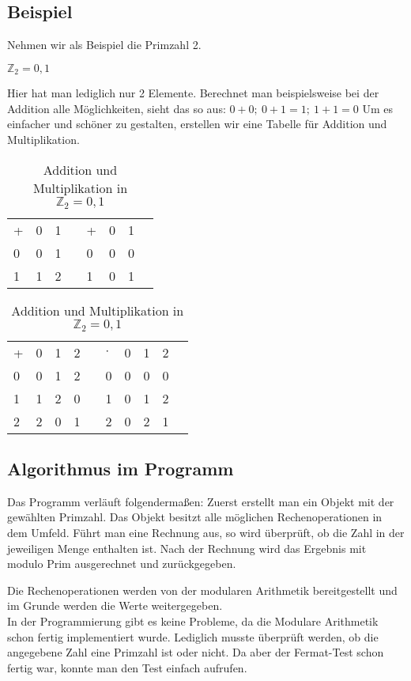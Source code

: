 \subsection*{Beispiel}
Nehmen wir als Beispiel die Primzahl 2.

$ \mathbb{Z}_2 = {0,1} $

Hier hat man lediglich nur 2 Elemente. Berechnet man beispielsweise bei der Addition alle Möglichkeiten, sieht das so aus: $0 + 0;\ 0 + 1 = 1;\ 1 + 1 = 0$ 
Um es einfacher und schöner zu gestalten, erstellen wir eine Tabelle für Addition und Multiplikation.


\begin{table}[!ht]\caption{Addition und Multiplikation in $ \mathbb{Z}_2 = {0,1} $}
    \begin{tabular}{l|l|lll|l|ll}
    + & 0 & 1 &  & + & 0 & 1 &  \\ \cline{1-3} \cline{5-7}
    0 & 0 & 1 &  & 0 & 0 & 0 &  \\ \cline{1-3} \cline{5-7}
    1 & 1 & 2 &  & 1 & 0 & 1 & 
    \end{tabular}
\end{table}
\begin{table}[!ht]\caption{Addition und Multiplikation in $ \mathbb{Z}_2 = {0,1} $}
    \begin{tabular}{l|l|l|lll|l|l|ll}
    + & 0 & 1 & 2 &  & $\cdot$ & 0 & 1 & 2 &  \\ \cline{1-4} \cline{6-9}
    0 & 0 & 1 & 2 &  & 0 & 0 & 0 & 0 &  \\ \cline{1-4} \cline{6-9}
    1 & 1 & 2 & 0 &  & 1 & 0 & 1 & 2 &  \\ \cline{1-4} \cline{6-9}
    2 & 2 & 0 & 1 &  & 2 & 0 & 2 & 1 & 
    \end{tabular}
\end{table}
\newpage
\subsection*{Algorithmus im Programm}

Das Programm verläuft folgendermaßen: Zuerst erstellt man ein Objekt mit der gewählten Primzahl. Das Objekt besitzt alle möglichen Rechenoperationen in dem Umfeld.
Führt man eine Rechnung aus, so wird überprüft, ob die Zahl in der jeweiligen Menge enthalten ist. Nach der Rechnung wird das Ergebnis mit modulo Prim ausgerechnet und zurückgegeben. 

Die Rechenoperationen werden von der modularen Arithmetik bereitgestellt und im Grunde werden die Werte weitergegeben.
\\
In der Programmierung gibt es keine Probleme, da die Modulare Arithmetik schon fertig implementiert wurde. 
Lediglich musste überprüft werden, ob die angegebene Zahl eine Primzahl ist oder nicht. Da aber der Fermat-Test schon fertig war, konnte man den Test einfach aufrufen. 
\\
\newpage
